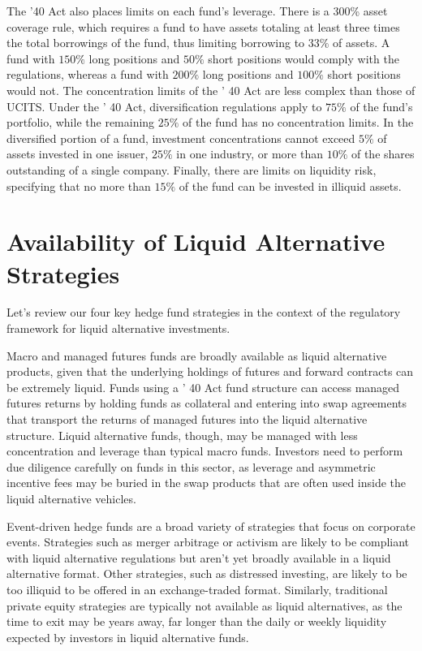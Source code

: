 \documentclass[11pt]{article}
\begin{document}
The '40 Act also places limits on each fund's leverage. There is a 300\% asset coverage rule, which requires a fund to have assets totaling at least three times the total borrowings of the fund, thus limiting borrowing to $33 \%$ of assets. A fund with $150 \%$ long positions and $50 \%$ short positions would comply with the regulations, whereas a fund with $200 \%$ long positions and $100 \%$ short positions would not. The concentration limits of the ' 40 Act are less complex than those of UCITS. Under the ' 40 Act, diversification regulations apply to $75 \%$ of the fund's portfolio, while the remaining $25 \%$ of the fund has no concentration limits. In the diversified portion of a fund, investment concentrations cannot exceed $5 \%$ of assets invested in one issuer, $25 \%$ in one industry, or more than $10 \%$ of the shares outstanding of a single company. Finally, there are limits on liquidity risk, specifying that no more than $15 \%$ of the fund can be invested in illiquid assets.

\section*{Availability of Liquid Alternative Strategies}
Let's review our four key hedge fund strategies in the context of the regulatory framework for liquid alternative investments.

Macro and managed futures funds are broadly available as liquid alternative products, given that the underlying holdings of futures and forward contracts can be extremely liquid. Funds using a ' 40 Act fund structure can access managed futures returns by holding funds as collateral and entering into swap agreements that transport the returns of managed futures into the liquid alternative structure. Liquid alternative funds, though, may be managed with less concentration and leverage than typical macro funds. Investors need to perform due diligence carefully on funds in this sector, as leverage and asymmetric incentive fees may be buried in the swap products that are often used inside the liquid alternative vehicles.

Event-driven hedge funds are a broad variety of strategies that focus on corporate events. Strategies such as merger arbitrage or activism are likely to be compliant with liquid alternative regulations but aren't yet broadly available in a liquid alternative format. Other strategies, such as distressed investing, are likely to be too illiquid to be offered in an exchange-traded format. Similarly, traditional private equity strategies are typically not available as liquid alternatives, as the time to exit may be years away, far longer than the daily or weekly liquidity expected by investors in liquid alternative funds.
\end{document}
